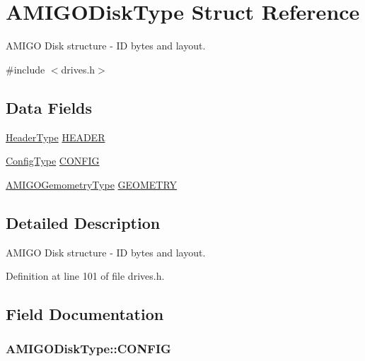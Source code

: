 \hypertarget{structAMIGODiskType}{}\section{A\+M\+I\+G\+O\+Disk\+Type Struct Reference}
\label{structAMIGODiskType}


A\+M\+I\+GO Disk structure -\/ ID bytes and layout.  




{\ttfamily \#include $<$drives.\+h$>$}

\subsection*{Data Fields}
\begin{DoxyCompactItemize}
\item 
\hyperlink{structHeaderType}{Header\+Type} \hyperlink{structAMIGODiskType_a9814efe6f564b104fc7e0100231908a8}{H\+E\+A\+D\+ER}
\item 
\hyperlink{structConfigType}{Config\+Type} \hyperlink{structAMIGODiskType_aae94c3403ceb917006591e7bd4109207}{C\+O\+N\+F\+IG}
\item 
\hyperlink{structAMIGOGemometryType}{A\+M\+I\+G\+O\+Gemometry\+Type} \hyperlink{structAMIGODiskType_aa75cfbfabf8081ff7bca08cf87af4da8}{G\+E\+O\+M\+E\+T\+RY}
\end{DoxyCompactItemize}


\subsection{Detailed Description}
A\+M\+I\+GO Disk structure -\/ ID bytes and layout. 

Definition at line 101 of file drives.\+h.



\subsection{Field Documentation}
\subsubsection[{\texorpdfstring{C\+O\+N\+F\+IG}{CONFIG}}]{ A\+M\+I\+G\+O\+Disk\+Type\+::\+C\+O\+N\+F\+IG}\hypertarget{structAMIGODiskType_aae94c3403ceb917006591e7bd4109207}{}\label{structAMIGODiskType_aae94c3403ceb917006591e7bd4109207}



